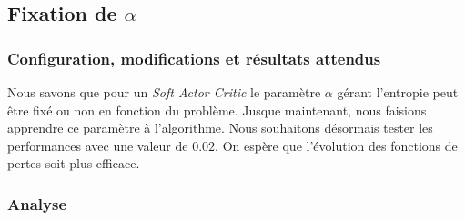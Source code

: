 \subsection{Fixation de \(\alpha\)}

\subsubsection{Configuration, modifications et résultats attendus}

Nous savons que pour un \emph{Soft Actor Critic} le paramètre \(\alpha\) gérant
l'entropie peut être fixé ou non en fonction du problème. Jusque maintenant,
nous faisions apprendre ce paramètre à l'algorithme. Nous souhaitons désormais tester les performances avec une valeur de $0.02$. On espère que l'évolution des fonctions de pertes soit plus efficace.

\subsubsection{Analyse}

